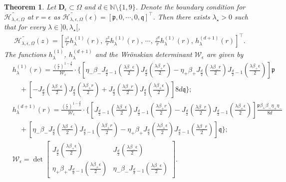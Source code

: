 \documentclass[11pt,a4paper,english,reqno]{amsart}
\theoremstyle{plain}
\newtheorem{theorem}[definition]{Theorem}
\newcommand{\e}{\epsilon}
\newcommand{\1}{\mathbbm{1}}
\begin{document}
\begin{theorem}\label{thm:H_reflected_domain_formula}
Let $\mathbf{D}_{\epsilon} \subset \Omega$ and $d \in \mathbb{N}\setminus\{1, 9\}$.  Denote the boundary condition for $\widetilde{\mathcal{H}_{\lambda,\e,\Omega}}$ at $r=\e$ as $\widetilde{\mathcal{H}_{\lambda,\e,\Omega}}(\epsilon) = [\mathfrak{p}, 0, \cdots, 0, \mathfrak{q}]^{\top}$. Then there exists $\lambda_\star >0$ such that for every $\lambda \in ]0, \lambda_\star[$,
\begin{align}\label{new, B}
 \widetilde{\mathcal{H}_{\lambda,\e,\Omega}}(z)  = \left[
\frac{z^{1}}{r}h_{ \lambda}^{(1)}(r),\,\frac{z^{2}}{r}h_{ \lambda}^{(1)}(r),\, \cdots, \, \frac{z^{d}}{r}h_{ \lambda}^{(1)}(r),\,h^{(d+1)}_{\lambda}(r) \right]^\top.
\end{align}
The functions $h^{(1)}_\lambda$, $h^{(d+1)}_\lambda$ and the Wr\"{o}nskian determinant $\mathcal{W}_\e$ are given by
\begin{align*}
&h^{(1)}_\lambda(r) = \frac{\left(\frac{r}{\e}\right)^{1-\frac{d}{2}}}{\mathcal{W}_\e}\cdot\Bigg\{\left[\eta_-\beta_-J_{\frac{d}{2}-1}\left(\frac{\lambda\beta_-\e}{2}\right)J_{\frac{d}{2}}\left(\frac{\lambda\beta_+r}{2}\right) -\eta_+\beta_+ J_{\frac{d}{2}}\left(\frac{\lambda\beta_-r}{2}\right)J_{\frac{d}{2}-1}\left(\frac{\lambda\beta_+\e}{2}\right)\right]\mathfrak{p} \\
&\quad  +\left[ - J_{\frac{d}{2}}\left(\frac{\lambda\beta_-\e}{2}\right)J_{\frac{d}{2}}\left(\frac{\lambda\beta_+ r}{2}\right)+  J_{\frac{d}{2}}\left(\frac{\lambda\beta_-r}{2}\right)J_{\frac{d}{2}}\left(\frac{\lambda\beta_+\e}{2}\right)\right]8d\mathfrak{q}\Bigg\};\\
&h^{(d+1)}_\lambda(r) =\frac{\left(\frac{r}{\e}\right)^{1-\frac{d}{2}}}{\mathcal{W}_\e}\cdot\Bigg\{\left[J_{\frac{d}{2}-1}\left(\frac{\lambda\beta_-\e}{2}\right)J_{\frac{d}{2}-1}\left(\frac{\lambda\beta_+r}{2}\right) - J_{\frac{d}{2}}\left(\frac{\lambda\beta_-r}{2}\right)J_{\frac{d}{2}-1}\left(\frac{\lambda\beta_+\e}{2}\right)\right]\frac{\mathfrak{p} \beta_{+}\beta_{-} \eta_{+}\eta_{-}}{8d} \\
&\quad + \left[  \eta_{-}\beta_{-} J_{\frac{d}{2}}\left(\frac{\lambda\beta_-\e}{2}\right)J_{\frac{d}{2}-1}\left(\frac{\lambda\beta_+ r}{2}\right)- \eta_{+}\beta_{+}J_{\frac{d}{2}}\left(\frac{\lambda\beta_+\e}{2}\right) J_{\frac{d}{2}-1}\left(\frac{\lambda\beta_-r}{2}\right) \right]\mathfrak{q}\Bigg\};\\
&\mathcal{W}_\e = \det \begin{bmatrix}
J_{\frac{d}{2}}\left( \frac{\lambda  \beta_+ \e}{2}\right) & J_{\frac{d}{2}}\left( \frac{\lambda  \beta_- \e}{2}\right)\\
\eta_+ \beta_+  J_{\frac{d}{2}-1} \left( \frac{\lambda \beta_+ \e}{2}\right) & \eta_- \beta_- J_{\frac{d}{2}-1} \left( \frac{\lambda \beta_- \e}{2}\right)
\end{bmatrix}.
\end{align*}
\end{theorem}
\end{document}
